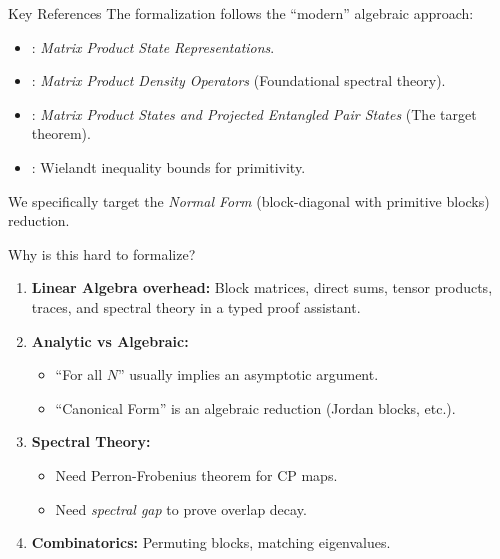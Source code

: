 \documentclass[aspectratio=169,10pt]{beamer}
\begin{document}
\begin{frame}{Key References}
    The formalization follows the ``modern'' algebraic approach:
    
    \begin{itemize}
        \item \textbf{\cite{Perez-Garcia2007Matrix}}: \emph{Matrix Product State Representations}.
        \item \textbf{\cite{Cirac2017Annals}}: \emph{Matrix Product Density Operators} (Foundational spectral theory).
        \item \textbf{\cite{Cirac2021Matrix}}: \emph{Matrix Product States and Projected Entangled Pair States} (The target theorem).
        \item \textbf{\cite{Sanz2010Quantum}}: Wielandt inequality bounds for primitivity.
    \end{itemize}

    We specifically target the \emph{Normal Form} (block-diagonal with primitive blocks) reduction.
\end{frame}

\begin{frame}{Why is this hard to formalize?}
    \begin{enumerate}
        \item \textbf{Linear Algebra overhead:} Block matrices, direct sums, tensor products, traces, and spectral theory in a typed proof assistant.
        \item \textbf{Analytic vs Algebraic:}
        \begin{itemize}
            \item ``For all $N$'' usually implies an asymptotic argument.
            \item ``Canonical Form'' is an algebraic reduction (Jordan blocks, etc.).
        \end{itemize}
        \item \textbf{Spectral Theory:}
        \begin{itemize}
            \item Need Perron-Frobenius theorem for CP maps.
            \item Need \emph{spectral gap} to prove overlap decay.
        \end{itemize}
        \item \textbf{Combinatorics:} Permuting blocks, matching eigenvalues.
    \end{enumerate}
\end{frame}
\end{document}
